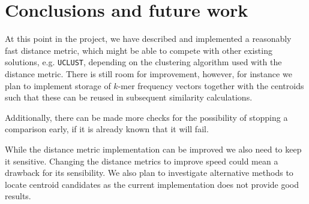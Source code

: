 \section{Conclusions and future work}

At this point in the project, we have described and implemented a reasonably
fast distance metric, which might be able to compete with other existing
solutions, e.g. \texttt{UCLUST}, depending on the clustering algorithm used
with the distance metric. There is still room for improvement, however, for
instance we plan to implement storage of $k$-mer frequency vectors together
with the centroids such that these can be reused in subsequent similarity
calculations.

Additionally, there can be made more checks for the possibility of stopping a
comparison early, if it is already known that it will fail.

While the distance metric implementation can be improved we also need to keep
it sensitive. Changing the distance metrics to improve speed could mean a
drawback for its sensibility. We also plan to investigate alternative methods
to locate centroid candidates as the current implementation does not provide
good results.

